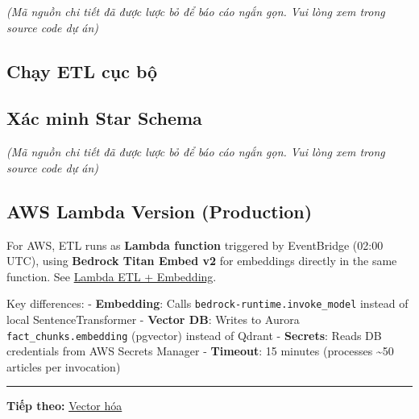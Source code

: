 \emph{(Mã nguồn chi tiết đã được lược bỏ để báo cáo ngắn gọn. Vui lòng
xem trong source code dự án)}

\hypertarget{chux1ea1y-etl-cux1ee5c-bux1ed9}{%
\subsection{Chạy ETL cục bộ}}

\begin{Shaded}
\begin{Highlighting}[]

  
\end{Highlighting}
\end{Shaded}

\hypertarget{xuxe1c-minh-star-schema}{%
\subsection{Xác minh Star Schema}}

\emph{(Mã nguồn chi tiết đã được lược bỏ để báo cáo ngắn gọn. Vui lòng
xem trong source code dự án)}

\hypertarget{aws-lambda-version-production}{%
\subsection{AWS Lambda Version
(Production)}}

For AWS, ETL runs as \textbf{Lambda function} triggered by EventBridge
(02:00 UTC), using \textbf{Bedrock Titan Embed v2} for embeddings
directly in the same function. See \href{5.12-Lambda-ETL/}{Lambda ETL +
Embedding}.

Key differences: - \textbf{Embedding}: Calls
\texttt{bedrock-runtime.invoke\_model} instead of local
SentenceTransformer - \textbf{Vector DB}: Writes to Aurora
\texttt{fact\_chunks.embedding} (pgvector) instead of Qdrant -
\textbf{Secrets}: Reads DB credentials from AWS Secrets Manager -
\textbf{Timeout}: 15 minutes (processes \textasciitilde50 articles per
invocation)

\begin{center}\rule{0.5\linewidth}{0.5pt}\end{center}

\textbf{Tiếp theo:} \href{5.8-Vectorize/}{Vector hóa}
